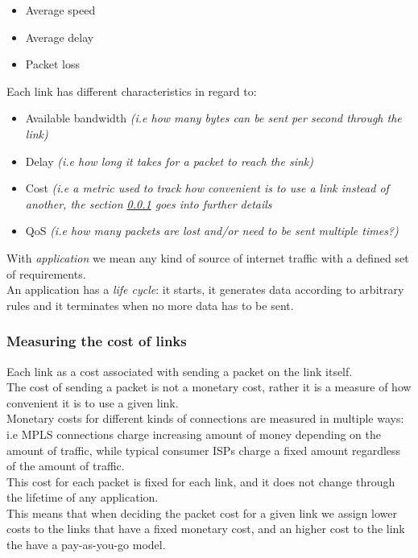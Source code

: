 \documentclass{article}
\begin{document}
\begin{itemize}
	\item Average speed
	\item Average delay
	\item Packet loss
\end{itemize}

Each link has different characteristics in regard to:
\begin{itemize}
	\item Available bandwidth \textit{(i.e how many bytes can be sent per second through the link)}
	\item Delay \textit{(i.e how long it takes for a packet to reach the sink)}
	\item Cost \textit{(i.e a metric used to track how convenient is to use a link instead of another, the section \ref{link_cost} goes into further details}
	\item QoS \textit{(i.e how many packets are lost and/or need to be sent multiple times?)}
\end{itemize} 

\begin{mdframed}[hidealllines=true,backgroundcolor=blue!20]
	With \textit{application} we mean any kind of source of internet traffic with a defined set of requirements. \\
	An application has a \textit{life cycle}: it starts, it generates data according to arbitrary rules and it terminates when no more data has to be sent. 
\end{mdframed} 



\subsubsection{Measuring the cost of links} \label{link_cost}
Each link as a cost associated with sending a packet on the link itself. \\
The cost of sending a packet is not a monetary cost, rather it is a measure of how convenient it is to use a given link. \\
Monetary costs for different kinds of connections are measured in multiple ways: i.e   MPLS connections charge increasing amount of money depending on the amount of traffic, while typical consumer ISPs charge a fixed amount regardless of the amount of traffic. \\
This cost for each packet is fixed for each link, and it does not change through the lifetime of any application. \\
This means that when deciding the packet cost for a given link we assign lower costs to the links that have a fixed monetary cost, and an higher cost to the link the have a pay-as-you-go model.
\end{document}
